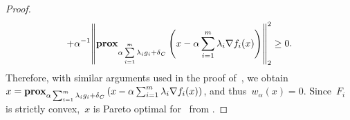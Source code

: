 \documentclass[../../main]{subfiles}
\begin{document}
\begin{proof}
\begin{multline}
                                   + \alpha^{-1} \norm*{\prox_{\alpha \sum\limits_{i = 1}^{m} \lambda_i g_i + \indicator_C}\left( x - \alpha \sum_{i = 1}^{m} \lambda_i \nabla f_i(x) \right)}_2^2 \ge 0
                               .\end{multline}
                               Therefore, with similar arguments used in the proof of~, we obtain~$x = \operatorname{\mathbf{prox}}_{\alpha \sum_{i = 1}^{m} \lambda_i g_i + \operatorname{\delta}_C}\left( x - \alpha \sum_{i = 1}^{m} \lambda_i \nabla f_i(x) \right)$, and thus~$w_\alpha(x) = 0$.
                               Since~$F_i$ is strictly convex,~$x$ is Pareto optimal for~ from .
                           \end{proof}
                           
\end{document}
